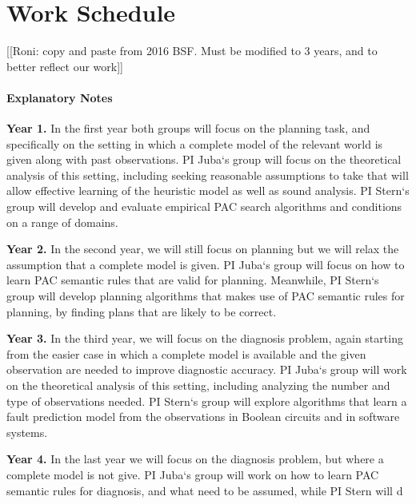 \documentclass[12pt]{article}
\begin{document}
\section*{Work Schedule}


[[Roni: copy and paste from 2016 BSF. Must be modified to 3 years, and to better reflect our work]]


\paragraph{Explanatory Notes}
{\bf Year 1.} In the first year both groups will focus on the planning task, and specifically on the setting in
which a complete model of the relevant world is given along with past observations. PI Juba`s group
will focus on the theoretical analysis of this setting, including seeking reasonable assumptions to take
that will allow effective learning of the heuristic model as well as sound analysis. PI Stern`s group will
develop and evaluate empirical PAC search algorithms and conditions on a range of domains.

{\bf Year 2.} In the second year, we will still focus on planning but we will relax the assumption that a
complete model is given. PI Juba`s group will focus on how to learn PAC semantic rules that are valid
for planning. Meanwhile, PI Stern`s group will develop planning algorithms that makes use of PAC
semantic rules for planning, by finding plans that are likely to be correct.


{\bf Year 3.} In the third year, we will focus on the diagnosis problem, again starting from the easier case in
which a complete model is available and the given observation are needed to improve diagnostic
accuracy. PI Juba`s group will work on the theoretical analysis of this setting, including analyzing the
number and type of observations needed. PI Stern`s group will explore algorithms that learn a fault
prediction model from the observations in Boolean circuits and in software systems.


{\bf Year 4.} In the last year we will focus on the diagnosis problem, but where a complete model is not
give. PI Juba`s group will work on how to learn PAC semantic rules for diagnosis, and what need to be
assumed, while PI Stern will d
\end{document}
